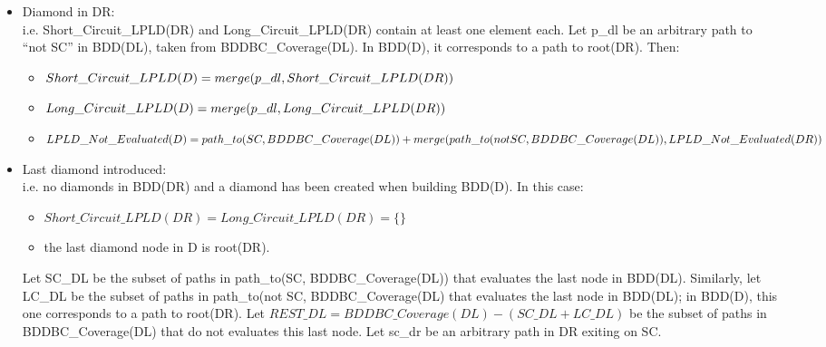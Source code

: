 \documentclass[a4paper,12pt,twoside]{article}
\begin{document}
\begin{description}
\begin{itemize}
  \item Diamond in DR:\\
    i.e. Short\_Circuit\_LPLD(DR) and Long\_Circuit\_LPLD(DR) contain at least
    one element each.
    Let p\_dl be an arbitrary path to ``not SC'' in BDD(DL), taken from
    BDDBC\_Coverage(DL). In BDD(D), it corresponds to a path to root(DR).
    Then:
    \begin{itemize}
    \item $Short\_Circuit\_LPLD(D) = merge({p\_dl},\\
                                     Short\_Circuit\_LPLD(DR))$
    \item $Long\_Circuit\_LPLD(D)  = merge({p\_dl},\\
                                        Long\_Circuit\_LPLD(DR))$
    \item $LPLD\_Not\_Evaluated(D) = path\_to(SC, BDDBC\_Coverage(DL))\\
                            + merge(path\_to(not SC, BDDBC\_Coverage(DL)),\\
                            LPLD\_Not\_Evaluated(DR))$
    \end{itemize}
  
  \item Last diamond introduced:\\
    i.e. no diamonds in BDD(DR) and a diamond has been created when building
    BDD(D). In this case:
    \begin{itemize}
    \item $Short\_Circuit\_LPLD(DR) = Long\_Circuit\_LPLD(DR) = \{\}$
    \item the last diamond node in D is root(DR).
    \end{itemize}

    Let SC\_DL be the subset of paths in path\_to(SC,
    BDDBC\_Coverage(DL)) that evaluates the last node in BDD(DL).
    Similarly, let LC\_DL be the subset of paths in path\_to(not SC,
    BDDBC\_Coverage(DL) that evaluates the last node in BDD(DL); in
    BDD(D), this one corresponds to a path to root(DR).  Let $REST\_DL
    = BDDBC\_Coverage(DL) - (SC\_DL + LC\_DL)$ be the subset of paths
    in BDDBC\_Coverage(DL) that do not evaluates this last node.  Let
    sc\_dr be an arbitrary path in DR exiting on SC.


\end{itemize}
\end{description}
\end{document}
